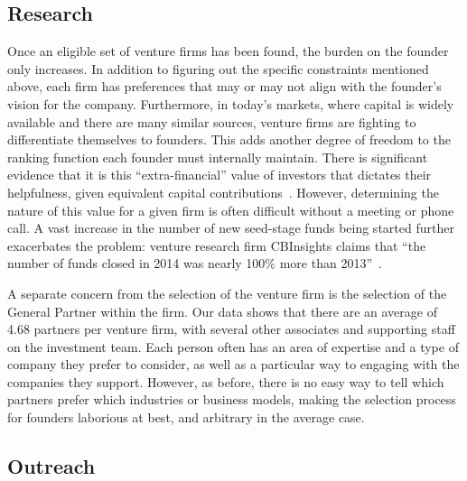 \subsection{Research}
\label{ch3:motivation:research}

Once an eligible set of venture firms has been found, the burden on the founder only increases. In addition to figuring out the specific constraints mentioned above, each firm has preferences that may or may not align with the founder's vision for the company. Furthermore, in today's markets, where capital is widely available and there are many similar sources, venture firms are fighting to differentiate themselves to founders. This adds another degree of freedom to the ranking function each founder must internally maintain. There is significant evidence that it is this ``extra-financial'' value of investors that dictates their helpfulness, given equivalent capital contributions~\cite{doi:10.1111/j.1540-6261.2004.00680.x}. However, determining the nature of this value for a given firm is often difficult without a meeting or phone call. A vast increase in the number of new seed-stage funds being started further exacerbates the problem: venture research firm CBInsights claims that ``the number of funds closed in 2014 was nearly 100\% more than 2013''~\cite{cbinsights-research-barbell}.

A separate concern from the selection of the venture firm is the selection of the General Partner within the firm. Our data shows that there are an average of 4.68 partners per venture firm, with several other associates and supporting staff on the investment team. Each person often has an area of expertise and a type of company they prefer to consider, as well as a particular way to engaging with the companies they support. However, as before, there is no easy way to tell which partners prefer which industries or business models, making the selection process for founders laborious at best, and arbitrary in the average case.

\subsection{Outreach}

